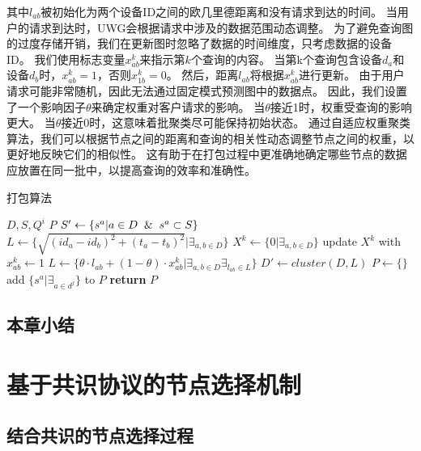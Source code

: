 其中$l_{ab}$被初始化为两个设备ID之间的欧几里德距离和没有请求到达的时间。
当用户的请求到达时，UWG会根据请求中涉及的数据范围动态调整。
为了避免查询图的过度存储开销，我们在更新图时忽略了数据的时间维度，只考虑数据的设备ID。
我们使用标志变量$x_{ab}^k$来指示第$k$个查询的内容。
当第k个查询包含设备$d_a$和设备$d_b$时，$x_{ab}^k=1$，否则$x_{1b}^k=0$。
然后，距离$l_{ab}$将根据$x_{ab}^k$进行更新。
由于用户请求可能非常随机，因此无法通过固定模式预测图中的数据点。
因此，我们设置了一个影响因子$\theta$来确定权重对客户请求的影响。
当$\theta$接近1时，权重受查询的影响更大。
当$\theta$接近0时，这意味着批聚类尽可能保持初始状态。
通过自适应权重聚类算法，我们可以根据节点之间的距离和查询的相关性动态调整节点之间的权重，以更好地反映它们的相似性。
这有助于在打包过程中更准确地确定哪些节点的数据应放置在同一批中，以提高查询的效率和准确性。

\begin{algorithm}[t]
	\caption{打包算法}
	\label{algo:package}
    \begin{algorithmic}[1]
        \REQUIRE $D, S, Q^{i}$
        \ENSURE $P$
        \STATE $S' \gets \{s^a | a \in D \And s^a \subset S\}$
        \STATE $L \gets \Big\{ \sqrt{ (id_a - id_b)^2 + (t_a - t_b)^2 } \Big| \exists_{a,b \in D} \Big\}$
        \STATE $X^k \gets \{0 | \exists_{a,b \in D} \}$
                \STATE \textnormal{update $X^k$ with $x^k_{ab} \gets 1$}
            \ENDIF
        \ENDFOR
        \STATE $L \gets \Big\{ \theta \cdot l_{ab} + (1 - \theta) \cdot x_{ab}^k \Big| \exists_{a,b \in D} \exists_{l_{ab} \in L} \Big\}$
        \STATE $D' \gets \textit{cluster}(D, L)$
        \STATE $P \gets \{\}$
            \STATE \textnormal{add $\{ s^a | \exists_{a \in d^j} \}$ to $P$}
        \ENDFOR
        \STATE \textbf{return} $P$
    \end{algorithmic}
\end{algorithm}

\section{本章小结}

\chapter{基于共识协议的节点选择机制}
\label{sec:consensus}

\section{结合共识的节点选择过程}

